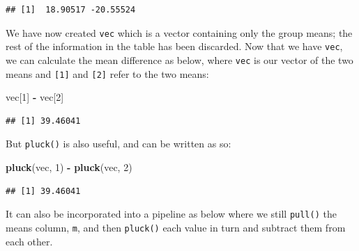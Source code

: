 \documentclass[]{book}
\newenvironment{Shaded}{\begin{snugshade}}{\end{snugshade}}
\newcommand{\CommentTok}[1]{\textcolor[rgb]{0.56,0.35,0.01}{\textit{#1}}}
\newcommand{\DecValTok}[1]{\textcolor[rgb]{0.00,0.00,0.81}{#1}}
\newcommand{\KeywordTok}[1]{\textcolor[rgb]{0.13,0.29,0.53}{\textbf{#1}}}
\newcommand{\NormalTok}[1]{#1}
\newcommand{\OperatorTok}[1]{\textcolor[rgb]{0.81,0.36,0.00}{\textbf{#1}}}
\newcommand{\StringTok}[1]{\textcolor[rgb]{0.31,0.60,0.02}{#1}}
\begin{document}
\begin{Shaded}
\end{Shaded}

\begin{verbatim}
## [1]  18.90517 -20.55524
\end{verbatim}

We have now created \texttt{vec} which is a vector containing only the group means; the rest of the information in the table has been discarded. Now that we have \texttt{vec}, we can calculate the mean difference as below, where \texttt{vec} is our vector of the two means and \texttt{{[}1{]}} and \texttt{{[}2{]}} refer to the two means:

\begin{Shaded}
\begin{Highlighting}[]
\NormalTok{vec[}\DecValTok{1}\NormalTok{] }\OperatorTok{-}\StringTok{ }\NormalTok{vec[}\DecValTok{2}\NormalTok{]}
\end{Highlighting}
\end{Shaded}

\begin{verbatim}
## [1] 39.46041
\end{verbatim}

But \texttt{pluck()} is also useful, and can be written as so:

\begin{Shaded}
\begin{Highlighting}[]
\KeywordTok{pluck}\NormalTok{(vec, }\DecValTok{1}\NormalTok{) }\OperatorTok{-}\StringTok{ }\KeywordTok{pluck}\NormalTok{(vec, }\DecValTok{2}\NormalTok{)}
\end{Highlighting}
\end{Shaded}

\begin{verbatim}
## [1] 39.46041
\end{verbatim}

It can also be incorporated into a pipeline as below where we still \texttt{pull()} the means column, \texttt{m}, and then \texttt{pluck()} each value in turn and subtract them from each other.

\begin{Shaded}
\end{Shaded}
\end{document}
